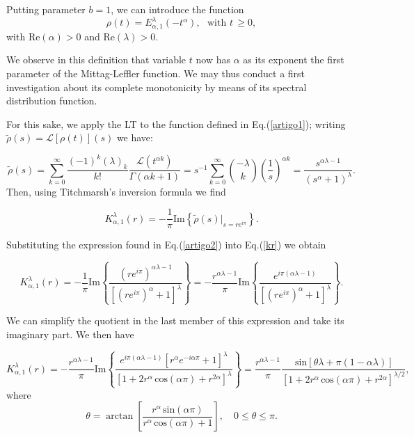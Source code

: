 \documentclass[12pt]{amsart}
\numberwithin{equation}{section}
\renewcommand{\sin}{\hspace{2pt}\textrm{sin}}
\renewcommand{\cos}{\hspace{2pt}\textrm{cos}}
\begin{document}
Putting parameter $b=1$, we can introduce the function 
\begin{equation}
	\rho(t)=E_{\alpha,1}^{\lambda}(-t^{\alpha}),\,\,\,\,
\mbox{with}\,\,t\,\geq 0, \label{artigo1}
\end{equation}
with $\mbox{Re}(\alpha)>0$ and $\mbox{Re}(\lambda)>0$.
	
We observe in this definition that variable $t$ now has $\alpha$ as its exponent the
first parameter of the Mittag-Leffler function. We may thus conduct a first investigation
about its complete monotonicity by means of its spectral distribution function. 

For this sake, we apply the LT to the function defined in
Eq.(\ref{artigo1}); writing $\tilde{\rho}(s)=\mathscr{L}[\rho(t)](s)$ we have:

\begin{equation}
	\tilde{\rho}(s)=\sum_{k=0}^{\infty}\frac{(-1)^{k}(\lambda)_k}{k!}
	\frac{\mathscr{L}( t^{\alpha k})}{\Gamma(\alpha k +
	1)}=s^{-1}\sum_{k=0}^{\infty}\binom{-\lambda}{k}\left( \frac{1}{s}\right)^{\alpha
	k}=\frac{s^{\alpha \lambda-1}}{(s^{\alpha} +1)^{\lambda}}.  \label{artigo2}
\end{equation} 
Then, using Titchmarsh's inversion formula we find 

\begin{equation}
K_{\alpha,1}^{\lambda}(r)=-\frac{1}{\pi}\mbox{Im}\left\{\tilde{\rho}(s)|_{s=re^{i\pi}}\right\}.
\label{kr}
\end{equation} 

Substituting the expression found in Eq.(\ref{artigo2}) into Eq.(\ref{kr}) we obtain

\begin{equation}
	K_{\alpha,1}^{\lambda}(r)=-\frac{1}{\pi}\mbox{Im}\left\{\frac{(re^{i\pi})^{\alpha
	\lambda-1}}{[(re^{i\pi})^{\alpha}+ 1]^{\lambda}}\right\}=-\frac{r^{\alpha
	\lambda-1}}{\pi}\mbox{Im}\left\{\frac{e^{i\pi(\alpha
	\lambda-1)}}{[(re^{i\pi})^{\alpha}+ 1]^{\lambda}}\right\}. 
\end{equation}

We can simplify the quotient in the last member of this expression and take its imaginary
part. We then have 

\begin{equation} K_{\alpha,1}^{\lambda}(r)=-\frac{r^{\alpha
	\lambda-1}}{\pi}\mbox{Im}\left\{\frac{e^{i\pi(\alpha \lambda-1)}[r^{\alpha}
	e^{-i\alpha\pi}+ 1]^{\lambda}}{[1+2r^{\alpha}\cos(\alpha \pi)+ r^{2
	\alpha}]^{\lambda}}\right\} =\frac{r^{\alpha \lambda-1}}{\pi}
\frac{\sin[\theta \lambda+\pi(1-\alpha \lambda)]}{[1+2r^{\alpha}\cos(\alpha\pi)+ r^{2\alpha}]^{\lambda /2}},
\label{artigo59}
\end{equation}
where 
\begin{equation}
	\theta=\arctan \left[
	\frac{r^{\alpha}\sin(\alpha \pi)}{r^{\alpha}\cos(\alpha\pi)+1} \right],
	\,\,\,\,\,\, 0\leq\theta\leq\pi. 
\end{equation}
\end{document}
